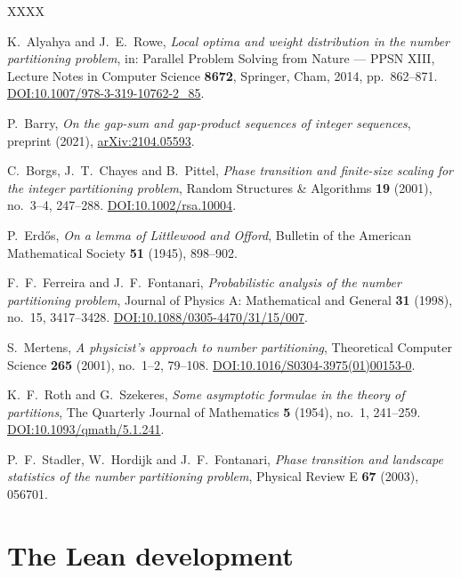 \documentclass[11pt,a4paper]{article}
\theoremstyle{plain}
\theoremstyle{definition}
\theoremstyle{remark}
\begin{document}
\begin{thebibliography}{XXXX}

K.~Alyahya and J.~E.~Rowe,
\emph{Local optima and weight distribution in the number partitioning problem},
in: Parallel Problem Solving from Nature --- PPSN XIII,
Lecture Notes in Computer Science \textbf{8672}, Springer, Cham, 2014,
pp.~862--871. \href{https://doi.org/10.1007/978-3-319-10762-2_85}{DOI:10.1007/978-3-319-10762-2\_85}.

P.~Barry,
\emph{On the gap-sum and gap-product sequences of integer sequences},
preprint (2021), \href{https://arxiv.org/abs/2104.05593}{arXiv:2104.05593}.

C.~Borgs, J.~T.~Chayes and B.~Pittel,
\emph{Phase transition and finite-size scaling for the integer partitioning
problem}, Random Structures \& Algorithms \textbf{19} (2001), no.~3--4,
247--288. \href{https://doi.org/10.1002/rsa.10004}{DOI:10.1002/rsa.10004}.

P.~Erd\H{o}s, \emph{On a lemma of Littlewood and Offord},
Bulletin of the American Mathematical Society \textbf{51} (1945), 898--902.

F.~F.~Ferreira and J.~F.~Fontanari,
\emph{Probabilistic analysis of the number partitioning problem},
Journal of Physics A: Mathematical and General \textbf{31} (1998), no.~15,
3417--3428.
\href{https://doi.org/10.1088/0305-4470/31/15/007}{DOI:10.1088/0305-4470/31/15/007}.

S.~Mertens, \emph{A physicist's approach to number partitioning},
Theoretical Computer Science \textbf{265} (2001), no.~1--2, 79--108.
\href{https://doi.org/10.1016/S0304-3975(01)00153-0}{DOI:10.1016/S0304-3975(01)00153-0}.

K.~F.~Roth and G.~Szekeres,
\emph{Some asymptotic formulae in the theory of partitions},
The Quarterly Journal of Mathematics \textbf{5} (1954), no.~1, 241--259.
\href{https://doi.org/10.1093/qmath/5.1.241}{DOI:10.1093/qmath/5.1.241}.

P.~F.~Stadler, W.~Hordijk and J.~F.~Fontanari,
\emph{Phase transition and landscape statistics of the number partitioning
problem}, Physical Review E \textbf{67} (2003), 056701.

\end{thebibliography}

\appendix

\section{The Lean development}\label{app:lean}
\end{document}

